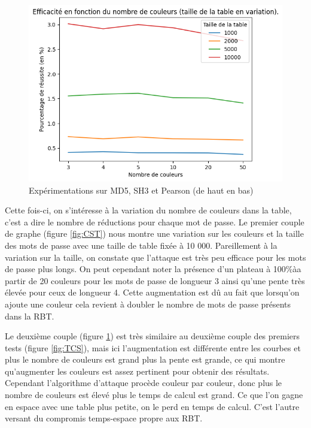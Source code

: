\documentclass[french,12pt]{article}
\begin{document}
\begin{figure}[hbt!]
      \includegraphics[scale=0.65]{img/graphe/pearson/C_T_S_137092_MotGenerator.png}

    \caption{Expérimentations sur MD5, SH3 et Pearson (de haut en bas)}
    \label{fig:CTS}
    \end{figure}
    
    \newpage
    
    Cette fois-ci, on s'intéresse à la variation du nombre de couleurs dans la table, c'est a dire le nombre de réductions pour chaque mot de passe. Le premier couple de graphe (figure \ref{fig:CST}) nous montre une variation sur les couleurs et la taille des mots de passe avec une taille de table fixée à 10 000. Pareillement à la variation sur la taille, on constate que l'attaque est très peu efficace pour les mots de passe plus longs. On peut cependant noter la présence d'un plateau à 100\%àa partir de 20 couleurs pour les mots de passe de longueur 3 ainsi qu'une pente très élevée pour ceux de longueur 4. Cette augmentation est dû au fait que lorsqu'on ajoute une couleur cela revient à doubler le nombre de mots de passe présents dans la RBT. 
    
    
    Le deuxième couple (figure \ref{fig:CTS}) est très similaire au deuxième couple des premiers tests (figure \ref{fig:TCS}), mais ici l'augmentation est différente entre les courbes et plus le nombre de couleurs est grand plus la pente est grande, ce qui montre qu'augmenter les couleurs est assez pertinent pour obtenir des résultats.
    Cependant l'algorithme d'attaque procède couleur par couleur, donc plus le nombre de couleurs est élevé plus le temps de calcul est grand. Ce que l'on gagne en espace avec une table plus petite, on le perd en temps de calcul. C'est l'autre versant du compromis temps-espace propre aux RBT.
\end{document}
